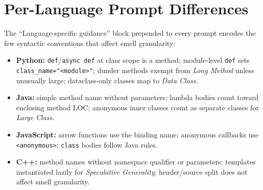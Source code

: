 \documentclass[conference]{IEEEtran}
\begin{document}
\section{Per-Language Prompt Differences}
\label{app:langdiffs}

The ``Language-specific guidance'' block prepended to every prompt encodes
the few syntactic conventions that affect smell granularity:
\begin{itemize}
 \item \textbf{Python:} \texttt{def}/\texttt{async def} at class scope is
 a method; module-level \texttt{def} sets
 \texttt{class\_name="<module>"}; dunder methods exempt from
 \textit{Long Method} unless unusually large; dataclass-only classes
 map to \textit{Data Class}.
 \item \textbf{Java:} simple method name without parameters; lambda
 bodies count toward enclosing method LOC; anonymous inner classes
 count as separate classes for \textit{Large Class}.
 \item \textbf{JavaScript:} arrow functions use the binding name;
 anonymous callbacks use \texttt{<anonymous>}; \texttt{class} bodies
 follow Java rules.
 \item \textbf{C++:} method names without namespace qualifier or
 parameters; templates instantiated lazily for \textit{Speculative
 Generality}; header/source split does not affect smell granularity.
\end{itemize}
\end{document}
